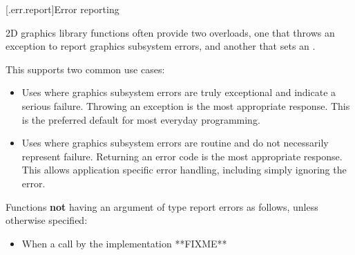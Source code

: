 [\iotwod.err.report]{Error reporting}

\pnum
2D graphics library functions often provide two overloads, one that throws an exception to report graphics subsystem errors, and another that sets an .

\pnum
\enternote
This supports two common use cases:

\begin{itemize}
\item Uses where graphics subsystem errors are truly exceptional and indicate a serious failure. Throwing an exception is the most appropriate response. This is the preferred default for most everyday programming.

\item Uses where graphics subsystem errors are routine and do not necessarily represent failure. Returning an error code is the most appropriate response. This allows application specific error handling, including simply ignoring the error.
\end{itemize}

\exitnote

\pnum
Functions \textbf{not} having an argument of type  report errors as follows, unless otherwise specified:

\begin{itemize}
\item When a call by the implementation **FIXME**
\end{itemize}
